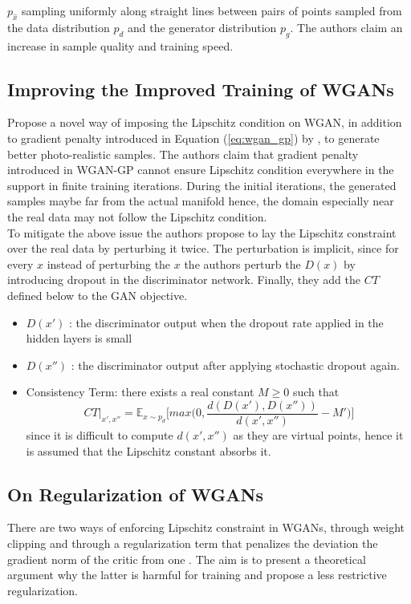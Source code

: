 $p_{\hat{x}}$ sampling uniformly along straight lines between pairs of points sampled from the data distribution $p_d$ and the generator distribution $p_{g}.$ The authors claim an increase in sample quality and training speed.

\subsection*{Improving the Improved Training of WGANs \citep{imp_wgan_gp}}
Propose a novel way of imposing the Lipschitz condition on WGAN, in addition to gradient penalty introduced in Equation (\ref{eq:wgan_gp}) by \citep{gularajani}, to generate better photo-realistic samples. The authors claim that gradient penalty introduced in WGAN-GP cannot ensure Lipschitz condition everywhere in the support in finite training iterations. During the initial iterations, the generated samples maybe far from the actual manifold hence, the domain especially near the real data may not follow the Lipschitz condition. \\
To mitigate the above issue the authors propose to lay the Lipschitz constraint over the real data by perturbing it twice. The perturbation is implicit, since for every $x$ instead of perturbing the $x$ the authors perturb the $D(x)$ by introducing dropout in the discriminator network. Finally, they add the $CT$ defined below to the GAN objective. 
\begin{itemize}
    \item $D(x')$ : the discriminator output when the dropout rate applied in the hidden layers is small
    \item $D(x'')$ : the discriminator output after applying stochastic dropout again.
    \item Consistency Term: there exists a real constant $M \geq 0$ such that 
    $$CT|_{x', x''} = \mathbb{E}_{x \sim p_d}\bigg[ max\bigg( 0, \frac{d(D(x'), D(x''))}{d(x', x'')} - M'\bigg) \bigg]$$
    since it is difficult to compute $d(x', x'')$ as they are virtual points, hence it is assumed that the Lipschitz constant absorbs it.
\end{itemize}{}

\subsection*{On Regularization of WGANs \citep{reg_wgan}}
There are two ways of enforcing Lipschitz constraint in WGANs, through weight clipping \citep{arjovskyWGAN} and through a regularization term that penalizes the deviation the gradient norm of the critic from one \citep{gularajani}. The aim is to present a theoretical argument why the latter is harmful for training and propose a less restrictive regularization. 

